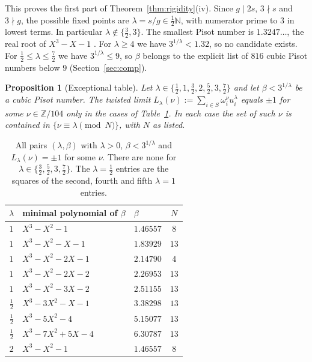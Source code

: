 \documentclass[11pt,a4paper]{article}
\newtheorem{proposition}[theorem]{Proposition}
\theoremstyle{definition}
\theoremstyle{remark}
\newcommand{\Z}{\mathbb{Z}}
\newcommand{\N}{\mathbb{N}}
\begin{document}
This proves the first part of Theorem~\ref{thm:rigidity}(iv).
Since $g\mid2s$, $3\nmid s$ and $3\nmid g$, the possible fixed points are $\lambda=s/g\in\frac12\N$, with numerator prime to $3$ in lowest terms. In particular $\lambda\notin\{\frac32,3\}$.
The smallest Pisot number is $1.3247\ldots$, the real root of $X^3-X-1$ \cite{Sie44}.
For $\lambda\ge4$ we have $3^{1/\lambda}<1.32$, so no candidate exists.
For $\frac12\le\lambda\le\frac72$ we have $3^{1/\lambda}\le9$, so $\beta$ belongs to the explicit list of $816$ cubic Pisot numbers below $9$ (Section~\ref{sec:comp}).

\begin{proposition}[Exceptional table]\label{prop:table}
Let $\lambda\in\{\frac12,1,\frac32,2,\frac52,3,\frac72\}$ and let $\beta<3^{1/\lambda}$ be a cubic Pisot number.
The twisted limit $L_\lambda(\nu):=\sum_{i\in S}\omega_i^\nu u_i^\lambda$ equals $\pm1$ for some $\nu\in\Z/104$ only in the cases of Table~\ref{tab:pos}.
In each case the set of such $\nu$ is contained in $\{\nu\equiv\lambda\pmod N\}$, with $N$ as listed.
\end{proposition}

\begin{table}[ht]
\centering
\begin{tabular}{cllc}
\toprule
$\lambda$ & minimal polynomial of $\beta$ & $\beta$ & $N$\\
\midrule
$1$ & $X^3-X^2-1$ & $1.46557$ & $8$\\
$1$ & $X^3-X^2-X-1$ & $1.83929$ & $13$\\
$1$ & $X^3-X^2-2X-1$ & $2.14790$ & $4$\\
$1$ & $X^3-X^2-2X-2$ & $2.26953$ & $13$\\
$1$ & $X^3-X^2-3X-2$ & $2.51155$ & $13$\\
$\tfrac12$ & $X^3-3X^2-X-1$ & $3.38298$ & $13$\\
$\tfrac12$ & $X^3-5X^2-4$ & $5.15077$ & $13$\\
$\tfrac12$ & $X^3-7X^2+5X-4$ & $6.30787$ & $13$\\
$2$ & $X^3-X^2-1$ & $1.46557$ & $8$\\
\bottomrule
\end{tabular}
\caption{All pairs $(\lambda,\beta)$ with $\lambda>0$, $\beta<3^{1/\lambda}$ and $L_\lambda(\nu)=\pm1$ for some $\nu$. There are none for $\lambda\in\{\frac32,\frac52,3,\frac72\}$. The $\lambda=\frac12$ entries are the squares of the second, fourth and fifth $\lambda=1$ entries.}\label{tab:pos}
\end{table}
\end{document}
